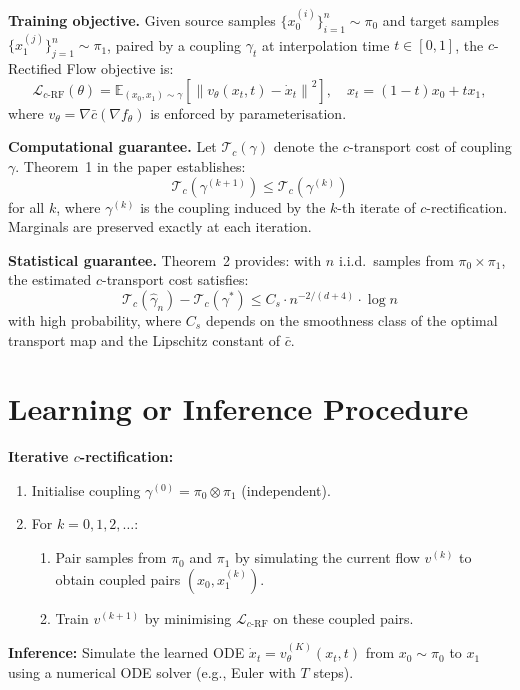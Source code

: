 \documentclass[10pt,twocolumn]{article}
\begin{document}
\textbf{Training objective.}
Given source samples $\{x_0^{(i)}\}_{i=1}^n \sim \pi_0$ and target samples
$\{x_1^{(j)}\}_{j=1}^n \sim \pi_1$, paired by a coupling $\gamma_t$ at
interpolation time $t \in [0,1]$, the $c$-Rectified Flow objective is:
\[
\mathcal{L}_{c\text{-RF}}(\theta) =
\mathbb{E}_{(x_0, x_1) \sim \gamma}\!\left[
\left\| v_\theta(x_t, t) - \dot x_t \right\|^2
\right],
\quad x_t = (1-t)x_0 + t x_1,
\]
where $v_\theta = \nabla\bar{c}(\nabla f_\theta)$ is enforced by parameterisation.

\textbf{Computational guarantee.}
Let $\mathcal{T}_c(\gamma)$ denote the $c$-transport cost of coupling $\gamma$.
Theorem~1 in the paper establishes:
\[
\mathcal{T}_c(\gamma^{(k+1)}) \leq \mathcal{T}_c(\gamma^{(k)})
\]
for all $k$, where $\gamma^{(k)}$ is the coupling induced by the $k$-th iterate
of $c$-rectification. Marginals are preserved exactly at each iteration.

\textbf{Statistical guarantee.}
Theorem~2 provides: with $n$ i.i.d.\ samples from $\pi_0 \times \pi_1$, the
estimated $c$-transport cost satisfies:
\[
\mathcal{T}_c(\hat\gamma_n) - \mathcal{T}_c(\gamma^*) \leq
C_s \cdot n^{-2/(d+4)} \cdot \log n
\]
with high probability, where $C_s$ depends on the smoothness class of the
optimal transport map and the Lipschitz constant of $\bar{c}$.

\section{Learning or Inference Procedure}

\textbf{Iterative $c$-rectification:}
\begin{enumerate}[itemsep=2pt,parsep=0pt]
  \item Initialise coupling $\gamma^{(0)} = \pi_0 \otimes \pi_1$ (independent).
  \item For $k = 0, 1, 2, \ldots$:
    \begin{enumerate}[itemsep=1pt,parsep=0pt]
      \item Pair samples from $\pi_0$ and $\pi_1$ by simulating the current
        flow $v^{(k)}$ to obtain coupled pairs $(x_0, x_1^{(k)})$.
      \item Train $v^{(k+1)}$ by minimising $\mathcal{L}_{c\text{-RF}}$ on
        these coupled pairs.
    \end{enumerate}
\end{enumerate}

\textbf{Inference:} Simulate the learned ODE
$\dot{x}_t = v^{(K)}_\theta(x_t, t)$ from $x_0 \sim \pi_0$ to $x_1$
using a numerical ODE solver (e.g., Euler with $T$ steps).
\end{document}
